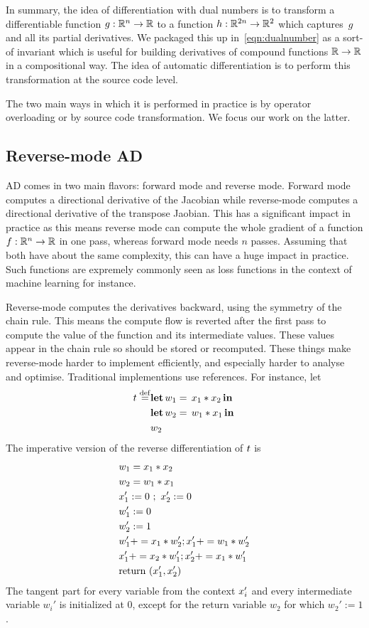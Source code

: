 In summary, the idea of differentiation with dual numbers is 
to transform a differentiable function
$g:\mathbb{R}^n\to \mathbb{R}$ to a function $h:\mathbb{R}^{2n}\to \mathbb{R}^2$ which captures~$g$ and all its partial derivatives. We packaged this up in~\eqref{eqn:dualnumber} as a sort-of invariant which is useful for building derivatives of compound functions $\mathbb{R}\to\mathbb{R}$ in a compositional way.
The idea of automatic differentiation is to perform this transformation at the source code level. 

The two main ways in which it is performed in practice is by operator overloading \cite{} or by source code transformation. We focus our work on the latter.

\subsection{Reverse-mode AD}

AD comes in two main flavors: forward mode and reverse mode. 
Forward mode computes a directional derivative of the Jacobian while reverse-mode computes a directional derivative of the transpose Jaobian. 
This has a significant impact in practice as this means reverse mode can compute the whole gradient of a function $f:\mathbb{R}^n\to \mathbb{R}$ in one pass, whereas forward mode needs $n$ passes. 
Assuming that both have about the same complexity, this can have a huge impact in practice. 
Such functions are expremely commonly seen as loss functions in the context of machine learning for instance.

Reverse-mode computes the derivatives backward, using the symmetry of the chain rule.
This means the compute flow is reverted after the first pass to compute the value of the function and its intermediate values. 
These values appear in the chain rule so should be stored or recomputed.
These things make reverse-mode harder to implement efficiently, and especially harder to analyse and optimise. 
Traditional implementions use references.
For instance, let 
 \begin{align*}
     \trm\defeq &\letin{w_1}{\var_1 * \var_2}{\\&\letin{w_2}{w_1 * \var_1}{\\&w_2}}
 \end{align*}
 The imperative version of the reverse differentiation of $\trm$ is
	\begin{align*}
		&w_1=\var_1 * \var_2 \\
		&w_2=w_1 * \var_1 \\
        &\var_1':=0~;~\var_2':=0 \\
        &w_1':=0 \\
		&w_2':=1 \\
		&w_1'+= \var_1 * w_2'; \var_1'+= w_1*w_2' \\
		&\var_1'+= \var_2 * w_1'; \var_2'+=\var_1 * w_1'\\
		&\text{return }(\var_1',\var_2')  
	\end{align*}
The tangent part for every variable from the context $\var_i'$ and every intermediate variable $w_i'$ is initialized at $0$, 
except for the return variable $w_2$ for which  $w_2':=1$. 


